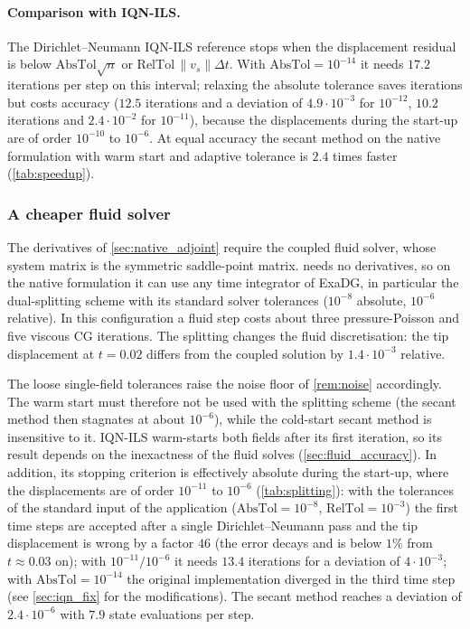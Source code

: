 \documentclass[11pt,a4paper]{article}
\theoremstyle{definition}
\theoremstyle{remark}
\begin{document}
\paragraph{Comparison with IQN-ILS.} The Dirichlet--Neumann IQN-ILS reference stops when the
displacement residual is below $\mathrm{AbsTol}\sqrt{n}$ or $\mathrm{RelTol}\,\|v_s\|\Delta t$. With
$\mathrm{AbsTol}=10^{-14}$ it needs $17.2$ iterations per step on this interval; relaxing the
absolute tolerance saves iterations but costs accuracy ($12.5$ iterations and a deviation of
$4.9\cdot10^{-3}$ for $10^{-12}$, $10.2$ iterations and $2.4\cdot10^{-2}$ for $10^{-11}$), because
the displacements during the start-up are of order $10^{-10}$ to $10^{-6}$. At equal accuracy the
secant method on the native formulation with warm start and adaptive tolerance is $2.4$ times faster
(\cref{tab:speedup}).

\subsubsection{A cheaper fluid solver}\label{sec:splitting}

The derivatives of \cref{sec:native_adjoint} require the coupled fluid solver, whose system matrix
is the symmetric saddle-point matrix.  needs no derivatives, so on the native
formulation it can use any time integrator of ExaDG, in particular the dual-splitting scheme with
its standard solver tolerances ($10^{-8}$ absolute, $10^{-6}$ relative). In this configuration a
fluid step costs about three pressure-Poisson and five viscous CG iterations. The splitting changes
the fluid discretisation: the tip displacement at $t=0.02$ differs from the coupled solution by
$1.4\cdot10^{-3}$ relative.

The loose single-field tolerances raise the noise floor of \cref{rem:noise} accordingly. The warm
start must therefore not be used with the splitting scheme (the secant method then stagnates at
about $10^{-6}$), while the cold-start secant method is insensitive to it. IQN-ILS warm-starts both
fields after its first iteration, so its result depends on the inexactness of the fluid solves
(\cref{sec:fluid_accuracy}). In addition, its stopping criterion is effectively absolute during the
start-up, where the displacements are of order $10^{-11}$ to $10^{-6}$ (\cref{tab:splitting}): with
the tolerances of the standard input of the application ($\mathrm{AbsTol}=10^{-8}$,
$\mathrm{RelTol}=10^{-3}$) the first time steps are accepted after a single Dirichlet--Neumann
pass and the tip displacement is wrong by a factor $46$ (the error decays and is below $1\%$ from
$t\approx0.03$ on); with $10^{-11}/10^{-6}$ it needs $13.4$ iterations for a deviation of
$4\cdot10^{-3}$; with $\mathrm{AbsTol}=10^{-14}$ the original implementation diverged in the third
time step (see \cref{sec:iqn_fix} for the modifications). The secant method reaches a deviation of
$2.4\cdot10^{-6}$ with $7.9$ state evaluations per step.
\end{document}
